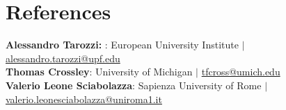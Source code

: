 \documentclass[12pt]{article}
\begin{document}
\section{References}
 \begin{itemize}[leftmargin=0.5cm, label={}]
    \small{\item{
     \textbf{Alessandro Tarozzi: }{: European University Institute  $|$ \href{mailto:alessandro.tarozzi@upf.edu}{alessandro.tarozzi@upf.edu}} \\
     \textbf{Thomas Crossley}{:  University of Michigan $|$ \href{mailto:tfcross@umich.edu}{tfcross@umich.edu}}  \\
     \textbf{Valerio Leone Sciabolazza}{:  Sapienza University of Rome $|$ \href{mailto:valerio.leonesciabolazza@uniroma1.it}{valerio.leonesciabolazza@uniroma1.it}} 
    }} \\
    
 \end{itemize} 
    
  
\end{document}
